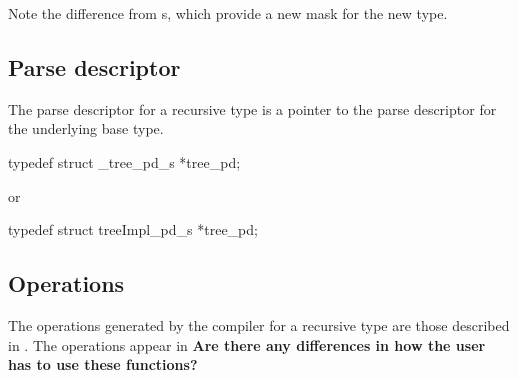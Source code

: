 Note the difference from \ptypedef{}s, which provide a new mask for the new type.

\subsection{Parse descriptor}
\label{sec:recur-parse-descriptors}
The parse descriptor for a recursive type is a pointer to the parse
descriptor for the underlying base type.
\begin{code}
typedef struct _tree_pd_s *tree_pd;
\end{code}
or
\begin{code}
typedef struct treeImpl_pd_s *tree_pd;
\end{code}

\subsection{Operations}
The operations generated by the \pads{} compiler for a recursive type are
those described in .
The operations appear in 
\textbf{Are there any differences in how the user has to use these
  functions?}

